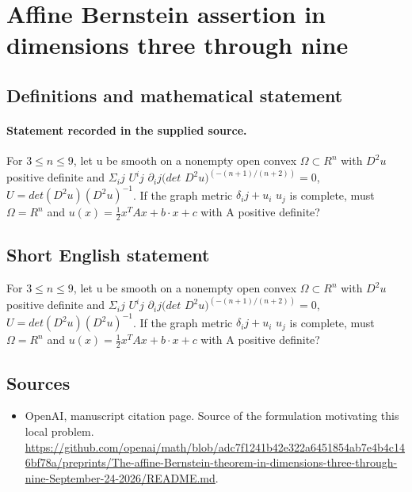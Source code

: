 \documentclass[11pt]{article}
\begin{document}
\section*{Affine Bernstein assertion in dimensions three through nine}\label{statement}
\subsection{Definitions and mathematical statement}
\paragraph{Statement recorded in the supplied source.}
For $3\leq n\leq 9$, let u be smooth on a nonempty open convex $\Omega \subset R^{n}$ with $D^{2}u$ positive definite and $\Sigma _ij$ $U^ij$ $\partial _ij(det$ $D^{2}u)^(-(n+1)/(n+2))=0$, $U=det(D^{2}u)(D^{2}u)^{-1}$. If the graph metric $\delta _ij+u_i$ $u_j$ is complete, must $\Omega =R^{n}$ and $u(x)=\tfrac12 x^{T}Ax+b\cdot x+c$ with A positive definite?
\subsection{Short English statement}
For $3\leq n\leq 9$, let u be smooth on a nonempty open convex $\Omega \subset R^{n}$ with $D^{2}u$ positive definite and $\Sigma _ij$ $U^ij$ $\partial _ij(det$ $D^{2}u)^(-(n+1)/(n+2))=0$, $U=det(D^{2}u)(D^{2}u)^{-1}$. If the graph metric $\delta _ij+u_i$ $u_j$ is complete, must $\Omega =R^{n}$ and $u(x)=\tfrac12 x^{T}Ax+b\cdot x+c$ with A positive definite?
\subsection{Sources}
\begin{itemize}
\item[S1] OpenAI, manuscript citation page. Source of the formulation motivating this local problem.
\url{https://github.com/openai/math/blob/adc7f1241b42e322a6451854ab7e4b4c146bf78a/preprints/The-affine-Bernstein-theorem-in-dimensions-three-through-nine-September-24-2026/README.md}.
\end{itemize}
\end{document}
